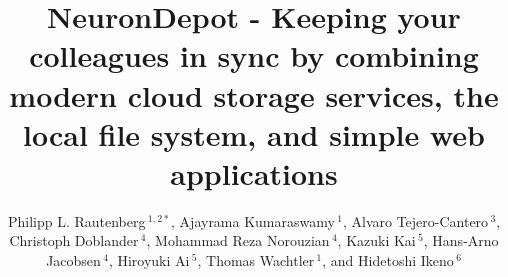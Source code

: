 \documentclass{frontiersSCNS} %
\def\firstAuthorLast{Rautenberg {et~al.}} %
\def\Authors{
Philipp L. Rautenberg\,$^{1,2*}$,
Ajayrama Kumaraswamy\,$^{1}$,
Alvaro Tejero-Cantero\,$^{3}$,
Christoph Doblander\,$^{4}$,
Mohammad Reza Norouzian\,$^{4}$,
Kazuki Kai\,$^{5}$,
Hans-Arno Jacobsen\,$^{4}$,
Hiroyuki Ai\,$^{5}$,
Thomas Wachtler\,$^{1}$,
and Hidetoshi Ikeno\,$^6$}
\begin{document}
\onecolumn
{}

\title[NeuronDepot - Keeping your colleagues in sync]{NeuronDepot - Keeping
your colleagues in sync by combining modern cloud storage services, the local
file system, and simple web applications}
\author[\firstAuthorLast ]{\Authors}
\address{}
\correspondance{}
\extraAuth{}%

\maketitle

\end{document}
